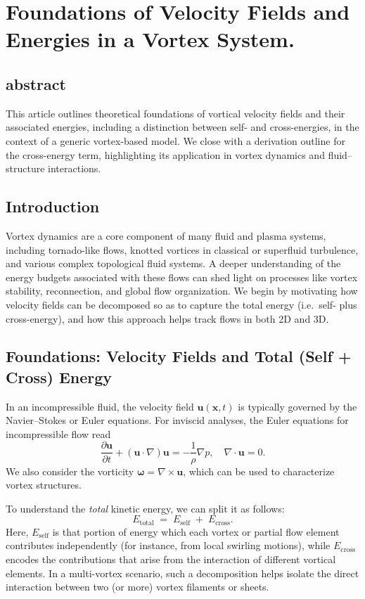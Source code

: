 \section{ Foundations of Velocity Fields and Energies in a Vortex System.}

\subsection{abstract}
This article outlines theoretical foundations of vortical velocity fields and their associated energies,
including a distinction between self- and cross-energies, in the context of a generic vortex-based model.
We close with a derivation outline for the cross-energy term, highlighting its application in vortex dynamics
and fluid–structure interactions.

\subsection{Introduction}
Vortex dynamics are a core component of many fluid and plasma systems, including
tornado-like flows, knotted vortices in classical or superfluid turbulence, and various
complex topological fluid systems. A deeper understanding of the energy budgets
associated with these flows can shed light on processes like vortex stability, reconnection,
and global flow organization. We begin by motivating how velocity fields can be
decomposed so as to capture the total energy (i.e.\ self- plus cross-energy), and how
this approach helps track flows in both 2D and 3D.

\subsection{Foundations: Velocity Fields and Total (Self + Cross) Energy}
\label{sec:foundations}
In an incompressible fluid, the velocity field $\mathbf{u}(\mathbf{x}, t)$ is typically
governed by the Navier--Stokes or Euler equations. For inviscid analyses, the Euler
equations for incompressible flow read
\begin{equation}
  \frac{\partial \mathbf{u}}{\partial t} + (\mathbf{u} \cdot \nabla)\mathbf{u} = -\frac{1}{\rho}\nabla p,
  \quad \nabla \cdot \mathbf{u} = 0.
\end{equation}
We also consider the vorticity $\boldsymbol{\omega} = \nabla \times \mathbf{u}$,
which can be used to characterize vortex structures.

To understand the \emph{total} kinetic energy, we can split it as follows:
\begin{equation}
  E_{\text{total}} \;=\; E_{\text{self}} \;+\; E_{\text{cross}}.
\end{equation}
Here, $E_{\text{self}}$ is that portion of energy which each vortex or partial flow
element contributes independently (for instance, from local swirling motions), while
$E_{\text{cross}}$ encodes the contributions that arise from the interaction of different
vortical elements. In a multi-vortex scenario, such a decomposition helps isolate the
direct interaction between two (or more) vortex filaments or sheets.

